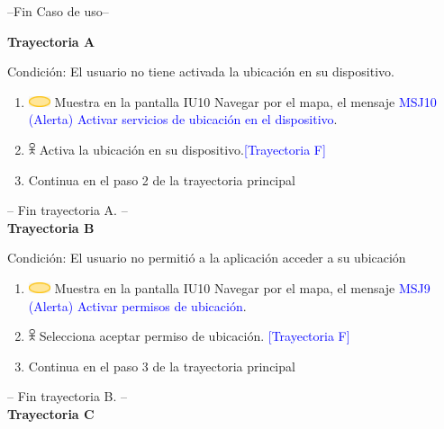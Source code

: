     --Fin Caso de uso-- \vspace{15pt}

\textbf{Trayectoria A}

Condición: El usuario no tiene activada la ubicación en su dispositivo.
\begin{enumerate}
    \item \includegraphics[width=0.0500\textwidth]{Figuras/sistema.png} Muestra en la pantalla IU10 Navegar por el mapa, el mensaje {\textcolor{blue}{MSJ10 (Alerta) Activar servicios de ubicación en el dispositivo}}.
    \item \includegraphics[width=0.0150\textwidth]{Figuras/persona.png} Activa la ubicación en su dispositivo.{\textcolor{blue}{[Trayectoria F]}}
    \item Continua en el paso  2 de la trayectoria principal
\end{enumerate}
-- Fin trayectoria A. --\\


\textbf{Trayectoria B}

Condición: El usuario no permitió a la aplicación acceder a su ubicación
\begin{enumerate}
    \item \includegraphics[width=0.0500\textwidth]{Figuras/sistema.png} Muestra en la pantalla IU10 Navegar por el mapa, el mensaje {\textcolor{blue}{MSJ9 (Alerta) Activar permisos de ubicación}}. 
    \item \includegraphics[width=0.0150\textwidth]{Figuras/persona.png} Selecciona aceptar permiso de ubicación. {\textcolor{blue}{[Trayectoria F]}}
    \item Continua en el paso  3 de la trayectoria principal
\end{enumerate}
-- Fin trayectoria B. --\\

\textbf{Trayectoria C}

